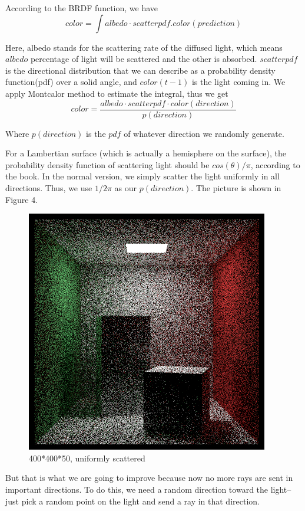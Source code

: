 \documentclass[10pt,conference,compsoc]{IEEEtran}
\begin{document}
According to the BRDF function, we have
$$
color =\int albedo\cdot scatterpdf.color(prediction)
$$


Here, albedo stands for the scattering rate of the diffused light, which means $albedo$ percentage of light will be scattered and the other is absorbed. $scatterpdf$ is the directional distribution that we can describe as a probability density function(pdf) over a solid angle, and $color(t-1)$ is the light coming in. We apply Montcalor method to estimate the integral, thus we get
$$
color= \frac{albedo \cdot scatterpdf \cdot color(direction)}{p(direction)}
$$

Where $p(direction)$  is the $pdf$ of whatever direction we randomly generate.

For a Lambertian surface (which is actually a hemisphere on the surface), the probability density function of scattering light should be $cos(\theta)/\pi$, according to the book. In the normal version, we simply scatter the light uniformly in all directions. Thus, we use $1/2\pi$ as our $p(direction)$. The picture is shown in Figure 4.

\begin{figure}[H]
	\centering
	\includegraphics[scale=0.3]{./pic/MC1.png}
	\caption{400*400*50, uniformly scattered}
	\label{fig:label}
\end{figure}

But that is what we are going to improve because now no more rays are sent in important directions. To do this, we need a random direction toward the light--just pick a random point on the light and send a ray in that direction.
\end{document}
